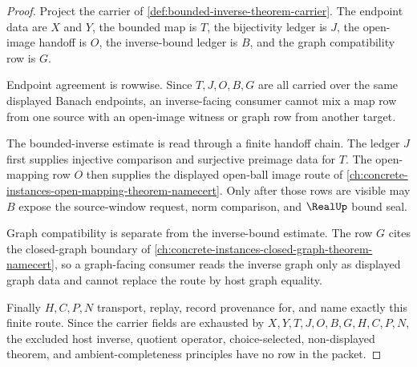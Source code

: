\begin{proof}
Project the carrier of \autoref{def:bounded-inverse-theorem-carrier}. The endpoint data are $X$ and $Y$, the bounded map is $T$, the bijectivity ledger is $J$, the open-image handoff is $O$, the inverse-bound ledger is $B$, and the graph compatibility row is $G$.

Endpoint agreement is rowwise. Since $T,J,O,B,G$ are all carried over the same displayed Banach endpoints, an inverse-facing consumer cannot mix a map row from one source with an open-image witness or graph row from another target.

The bounded-inverse estimate is read through a finite handoff chain. The ledger $J$ first supplies injective comparison and surjective preimage data for $T$. The open-mapping row $O$ then supplies the displayed open-ball image route of \autoref{ch:concrete-instances-open-mapping-theorem-namecert}. Only after those rows are visible may $B$ expose the source-window request, norm comparison, and $\RealUp$ bound seal.

Graph compatibility is separate from the inverse-bound estimate. The row $G$ cites the closed-graph boundary of \autoref{ch:concrete-instances-closed-graph-theorem-namecert}, so a graph-facing consumer reads the inverse graph only as displayed graph data and cannot replace the route by host graph equality.

Finally $H,C,P,N$ transport, replay, record provenance for, and name exactly this finite route. Since the carrier fields are exhausted by $X,Y,T,J,O,B,G,H,C,P,N$, the excluded host inverse, quotient operator, choice-selected, non-displayed theorem, and ambient-completeness principles have no row in the packet.
\end{proof}

